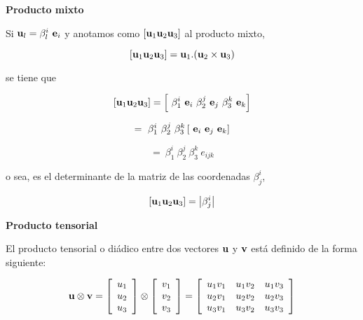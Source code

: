 \noindent
\textbf{Producto mixto}

Si $\bold{u}_l=\beta_l^i~\bold{e}_i$  y anotamos como $\left[\bold{u}_1\bold{u}_2\bold{u}_3\right]$ al producto mixto,

 $$\left[\bold{u}_1\bold{u}_2\bold{u}_3\right]= \bold{u}_1.(\bold{u}_2\times\bold{u}_3)$$

\noindent
se tiene que 

\bigskip

$$\left[\bold{u}_1\bold{u}_2\bold{u}_3\right]=\left[ ~\beta_1^i~\bold{e}_i  ~\beta_2^j~\bold{e}_j ~\beta_3^k~\bold{e}_k \right]$$

\bigskip


$$=~\beta_1^i~\beta_2^j~\beta_3^k\left[  ~\bold{e}_i~\bold{e}_j~\bold{e}_k   \right]$$

\bigskip

$$=~\beta_1^i~\beta_2^j~\beta_3^k ~e_{ijk}$$


\bigskip


\noindent
o sea, es el determinante de la matriz de las coordenadas $\beta_j^i $, 

\bigskip

$$\left[\bold{u}_1\bold{u}_2\bold{u}_3\right]=\left|\beta_j^i  \right|$$



\bigskip

\noindent
\textbf{Producto tensorial}

El producto tensorial o diádico entre dos vectores $\bold{u}$  y $\bold{v}$ está definido de la forma siguiente:

\begin{equation}
\bold{u} \otimes \bold{v}=  \left[ \begin{array}{c} u_1 \\ u_2
\\  u_3
\end{array}
 \right]  \otimes   \left[ \begin{array}{c} v_1 \\ v_2
\\  v_3
\end{array}
 \right] = \left[ \begin{array}{ccc} u_1 v_1  & u_1 v_2 & u_1 v_3 \\ u_2 v_1  & u_2 v_2 & u_2 v_3
\\  u_3 v_1  & u_3 v_2 & u_3 v_3
\end{array}
 \right]
 \label{ptensvectores}
\end{equation}

